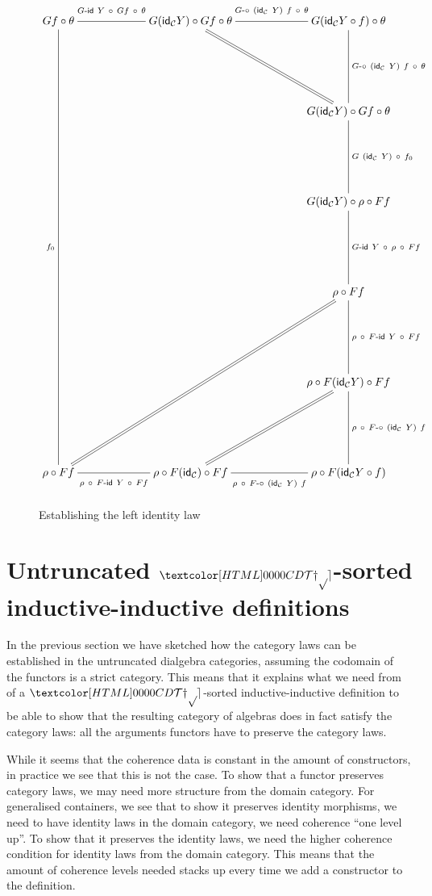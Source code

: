 \begin{figure}
  \centering
  $$
\xymatrix@C+=6em@!R{
G f \circ \theta %
\ar@{-}[r]^-*+{\labelstyle \Gid\ Y\ \circ\ Gf\ \circ\ \theta}
\ar@{-}[dddddddddd]_-{f_0}
&
G (\id_{\Cc} Y) \circ Gf \circ \theta %
\ar@{-}[r]^-*+{\labelstyle \Gcomp\ (\id_{\Cc}\ Y)\ f\ \circ\ \theta}
\ar@{=}[rdd]
&G (\id_{\Cc} Y \circ f) \circ \theta %
\ar@{-}[dd]^-{\Gcomp\ (\id_{\Cc}\ Y)\ f\ \circ\ \theta}
\\
\\
&&G (\id_{\Cc} Y) \circ Gf \circ \theta %
\ar@{-}[dd]^-{G\ (\id_{\Cc}\ Y)\ \circ\ f_0}
\\
\\
&&G (\id_{\Cc} Y) \circ \rho \circ Ff %
\ar@{-}[dd]^-{\Gid\ Y\ \circ\ \rho\ \circ\ Ff}
\\
\\
&&\rho \circ Ff %
\ar@{-}[dd]^-{\rho\ \circ\ \Fid\ Y\ \circ\ Ff}
\\
\\
&&\rho \circ F (\id_{\Cc} Y) \circ Ff %
\ar@{-}[dd]^-{\rho\ \circ\ \Fcomp\ (\id_{\Cc}\ Y)\ f}
\\
\\
\rho \circ Ff %
\ar@{-}[r]_-*+{\labelstyle \rho\ \circ\ \Fid\ Y\ \circ\ Ff}
\ar@{=}[uuuurr]
&\rho \circ F (\id_{\Cc}) \circ Ff %
\ar@{-}[r]_-*+{\labelstyle \rho\ \circ\ \Fcomp\ (\id_{\Cc}\ Y)\ f}
\ar@{=}[uur]
&\rho \circ F (\id_{\Cc} Y \circ f) %
}
$$

\caption{Establishing the left identity law}
\label{left-identity-calculation}
\end{figure}

\section{Untruncated $\TYPE$-sorted inductive-inductive definitions}

In the previous section we have sketched how the category laws can be
established in the untruncated dialgebra categories, assuming the
codomain of the functors is a strict category. This means that it
explains what we need from of a $\TYPE$-sorted inductive-inductive
definition to be able to show that the resulting category of algebras
does in fact satisfy the category laws: all the arguments functors
have to preserve the category laws.

While it seems that the coherence data is constant in the amount of
constructors, in practice we see that this is not the case. To show
that a functor preserves category laws, we may need more structure
from the domain category. For generalised containers, we see that to
show it preserves identity morphisms, we need to have identity laws in
the domain category, \ie we need coherence ``one level up''. To show
that it preserves the identity laws, we need the higher coherence
condition for identity laws from the domain category. This means that
the amount of coherence levels needed stacks up every time we add a
constructor to the definition.

